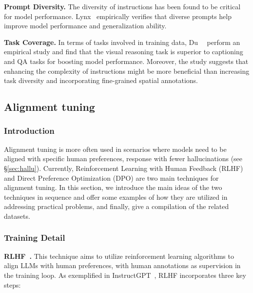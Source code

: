 \noindent \textbf{Prompt Diversity.}
The diversity of instructions has been found to be critical for model performance. Lynx~\cite{zeng2023matters} empirically verifies that diverse prompts help improve model performance and generalization ability. 

\noindent \textbf{Task Coverage.}
In terms of tasks involved in training data, Du~\etal~\cite{du2023makes} perform an empirical study and find that the visual reasoning task is superior to captioning and QA tasks for boosting model performance. Moreover, the study suggests that enhancing the complexity of instructions might be more beneficial than increasing task diversity and incorporating fine-grained spatial annotations.


\subsection{Alignment tuning}
\label{sec:train_align_tune}

\subsubsection{Introduction}
Alignment tuning is more often used in scenarios where models need to be aligned with specific human preferences, \eg response with fewer hallucinations (see \S \ref{sec:hallu}).
Currently, Reinforcement Learning with Human Feedback (RLHF) and Direct Preference Optimization (DPO) are two main techniques for alignment tuning. In this section, we introduce the main ideas of the two techniques in sequence and offer some examples of how they are utilized in addressing practical problems, and finally, give a compilation of the related datasets.

\subsubsection{Training Detail}

\noindent \textbf{RLHF~\cite{ziegler2019fine, stiennon2020learning}.}
This technique aims to utilize reinforcement learning algorithms to align LLMs with human preferences, with human annotations as supervision in the training loop. As exemplified in InstructGPT~\cite{ouyang2022training}, RLHF incorporates three key steps:

